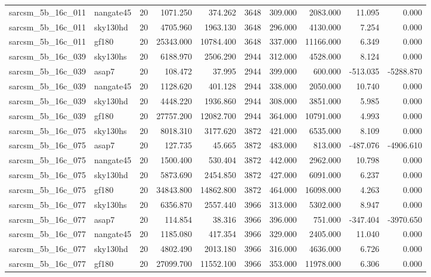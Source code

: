 \begin{tabular}{llrrrrrrrr}
sarcsm\_5b\_16c\_011 & nangate45 & 20 & 1071.250 & 374.262 & 3648 & 309.000 & 2083.000 & 11.095 & 0.000 \\
sarcsm\_5b\_16c\_011 & sky130hd & 20 & 4705.960 & 1963.130 & 3648 & 296.000 & 4130.000 & 7.254 & 0.000 \\
sarcsm\_5b\_16c\_011 & gf180 & 20 & 25343.000 & 10784.400 & 3648 & 337.000 & 11166.000 & 6.349 & 0.000 \\
sarcsm\_5b\_16c\_039 & sky130hs & 20 & 6188.970 & 2506.290 & 2944 & 312.000 & 4528.000 & 8.124 & 0.000 \\
sarcsm\_5b\_16c\_039 & asap7 & 20 & 108.472 & 37.995 & 2944 & 399.000 & 600.000 & -513.035 & -5288.870 \\
sarcsm\_5b\_16c\_039 & nangate45 & 20 & 1128.620 & 401.128 & 2944 & 338.000 & 2050.000 & 10.740 & 0.000 \\
sarcsm\_5b\_16c\_039 & sky130hd & 20 & 4448.220 & 1936.860 & 2944 & 308.000 & 3851.000 & 5.985 & 0.000 \\
sarcsm\_5b\_16c\_039 & gf180 & 20 & 27757.200 & 12082.700 & 2944 & 364.000 & 10791.000 & 4.993 & 0.000 \\
sarcsm\_5b\_16c\_075 & sky130hs & 20 & 8018.310 & 3177.620 & 3872 & 421.000 & 6535.000 & 8.109 & 0.000 \\
sarcsm\_5b\_16c\_075 & asap7 & 20 & 127.735 & 45.665 & 3872 & 483.000 & 813.000 & -487.076 & -4906.610 \\
sarcsm\_5b\_16c\_075 & nangate45 & 20 & 1500.400 & 530.404 & 3872 & 442.000 & 2962.000 & 10.798 & 0.000 \\
sarcsm\_5b\_16c\_075 & sky130hd & 20 & 5873.690 & 2454.850 & 3872 & 427.000 & 6091.000 & 6.237 & 0.000 \\
sarcsm\_5b\_16c\_075 & gf180 & 20 & 34843.800 & 14862.800 & 3872 & 464.000 & 16098.000 & 4.263 & 0.000 \\
sarcsm\_5b\_16c\_077 & sky130hs & 20 & 6356.870 & 2557.440 & 3966 & 313.000 & 5302.000 & 8.947 & 0.000 \\
sarcsm\_5b\_16c\_077 & asap7 & 20 & 114.854 & 38.316 & 3966 & 396.000 & 751.000 & -347.404 & -3970.650 \\
sarcsm\_5b\_16c\_077 & nangate45 & 20 & 1185.080 & 417.354 & 3966 & 329.000 & 2405.000 & 11.040 & 0.000 \\
sarcsm\_5b\_16c\_077 & sky130hd & 20 & 4802.490 & 2013.180 & 3966 & 316.000 & 4636.000 & 6.726 & 0.000 \\
sarcsm\_5b\_16c\_077 & gf180 & 20 & 27099.700 & 11552.100 & 3966 & 353.000 & 11978.000 & 6.306 & 0.000 \\

\end{tabular}
